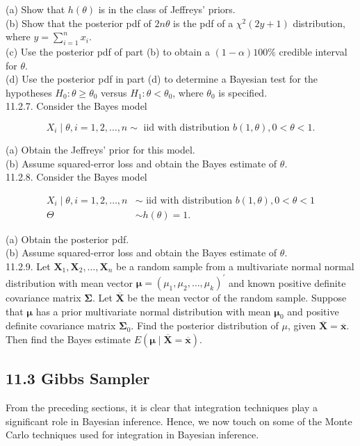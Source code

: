 (a) Show that $h(\theta)$ is in the class of Jeffreys' priors.\\
(b) Show that the posterior pdf of $2 n \theta$ is the pdf of a $\chi^{2}(2 y+1)$ distribution, where $y=\sum_{i=1}^{n} x_{i}$.\\
(c) Use the posterior pdf of part (b) to obtain a $(1-\alpha) 100 \%$ credible interval for $\theta$.\\
(d) Use the posterior pdf in part (d) to determine a Bayesian test for the hypotheses $H_{0}: \theta \geq \theta_{0}$ versus $H_{1}: \theta<\theta_{0}$, where $\theta_{0}$ is specified.\\
11.2.7. Consider the Bayes model

$$
X_{i} \mid \theta, i=1,2, \ldots, n \sim \text { iid with distribution } b(1, \theta), 0<\theta<1 .
$$

(a) Obtain the Jeffreys' prior for this model.\\
(b) Assume squared-error loss and obtain the Bayes estimate of $\theta$.\\
11.2.8. Consider the Bayes model

$$
\begin{aligned}
X_{i} \mid \theta, i=1,2, \ldots, n & \sim \text { iid with distribution } b(1, \theta), 0<\theta<1 \\
\Theta & \sim h(\theta)=1 .
\end{aligned}
$$

(a) Obtain the posterior pdf.\\
(b) Assume squared-error loss and obtain the Bayes estimate of $\theta$.\\
11.2.9. Let $\mathbf{X}_{1}, \mathbf{X}_{2}, \ldots, \mathbf{X}_{n}$ be a random sample from a multivariate normal normal distribution with mean vector $\boldsymbol{\mu}=\left(\mu_{1}, \mu_{2}, \ldots, \mu_{k}\right)^{\prime}$ and known positive definite covariance matrix $\boldsymbol{\Sigma}$. Let $\overline{\mathbf{X}}$ be the mean vector of the random sample. Suppose that $\boldsymbol{\mu}$ has a prior multivariate normal distribution with mean $\boldsymbol{\mu}_{0}$ and positive definite covariance matrix $\boldsymbol{\Sigma}_{0}$. Find the posterior distribution of $\mu$, given $\overline{\mathbf{X}}=\overline{\mathbf{x}}$. Then find the Bayes estimate $E(\boldsymbol{\mu} \mid \overline{\mathbf{X}}=\overline{\mathbf{x}})$.

\subsection*{11.3 Gibbs Sampler}
From the preceding sections, it is clear that integration techniques play a significant role in Bayesian inference. Hence, we now touch on some of the Monte Carlo techniques used for integration in Bayesian inference.

